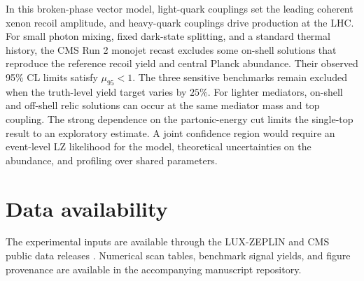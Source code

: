 \documentclass[aps,prd,reprint,superscriptaddress,longbibliography,floatfix]{revtex4-2}
\begin{document}
In this broken-phase vector model, light-quark couplings set the leading coherent xenon recoil amplitude, and heavy-quark couplings drive production at the LHC. For small photon mixing, fixed dark-state splitting, and a standard thermal history, the CMS Run 2 monojet recast excludes some on-shell solutions that reproduce the reference recoil yield and central Planck abundance. Their observed 95\% CL limits satisfy $\mu_{95}<1$. The three sensitive benchmarks remain excluded when the truth-level yield target varies by $25\%$. For lighter mediators, on-shell and off-shell relic solutions can occur at the same mediator mass and top coupling. The strong dependence on the partonic-energy cut limits the single-top result to an exploratory estimate. A joint confidence region would require an event-level LZ likelihood for the model, theoretical uncertainties on the abundance, and profiling over shared parameters.



\section*{Data availability}
The experimental inputs are available through the LUX-ZEPLIN and CMS public
data releases \cite{lzdata,cmscovariance,cmsyields,cmssignal,cmscutflow}.
Numerical scan tables, benchmark signal yields, and figure provenance
are available in the accompanying manuscript repository.

\clearpage
\onecolumngrid


\clearpage
\twocolumngrid

\end{document}
